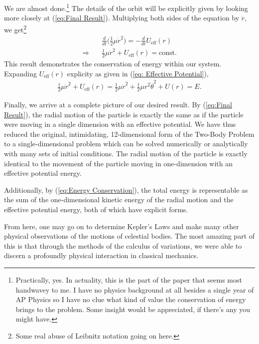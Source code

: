 \documentclass[10pt, psamsfonts]{amsart}
\theoremstyle{definition}
\theoremstyle{remark}
\numberwithin{equation}{section}
\begin{document}
We are almost done.\footnote{Practically, yes. In actuality, this is the part of the paper that seems most handwavey to me. I have no physics background at all besides a single year of AP Physics so I have no clue what kind of value the conservation of energy brings to the problem. Some insight would be appreciated, if there's any you might have.} The details of the orbit will be explicitly given by looking more closely at (\ref{eq:Final Result}). Multiplying both sides of the equation by $\dot{r}$, we get\footnote{Some real abuse of Leibnitz notation going on here.}
\begin{align*}
  & \frac{d}{dt} \bigg(\frac{1}{2} \mu \dot{r}^2 \bigg) = -\frac{d}{dt} U_{\text{eff}}(r)\\
  \Rightarrow \quad &  \frac{1}{2} \mu \dot{r}^2 + U_{\text{eff}}(r) = \text{const.}
\end{align*}
This result demonstrates the conservation of energy within our system. Expanding $U_{\text{eff}}(r) $ explicity as given in (\ref{eq: Effective Potential}),
\begin{gather}
    \label{eq:Energy Conservation}
  \frac{1}{2} \mu \dot{r}^2 + U_{\text{eff}}(r) = \frac{1}{2}  \mu \dot{r}^2 + \frac{1}{2} \mu r^2 \dot{\theta} ^2 + U(r)
  = E.
\end{gather}

Finally, we arrive at a complete picture of our desired result. By (\ref{eq:Final Result}), the radial motion of the particle is exactly the same as if the particle were moving in a single dimension with an effective potential. We have thus reduced the original, intimidating, 12-dimensional form of the Two-Body Problem to a single-dimensional problem which can be solved numerically or analytically with many sets of initial conditions. The radial motion of the particle is exactly identical to the movement of the particle moving in one-dimension with an effective potential energy. 

Additionally, by (\ref{eq:Energy Conservation}), the total energy is representable as the sum of the one-dimensional kinetic energy of the radial motion and the effective potential energy, both of which have explicit forms.

From here, one may go on to determine Kepler's Laws and make many other physical observations of the motions of celestial bodies. The most amazing part of this is that through the methods of the calculus of variations, we were able to discern a profoundly physical interaction in classical mechanics.
\end{document}
